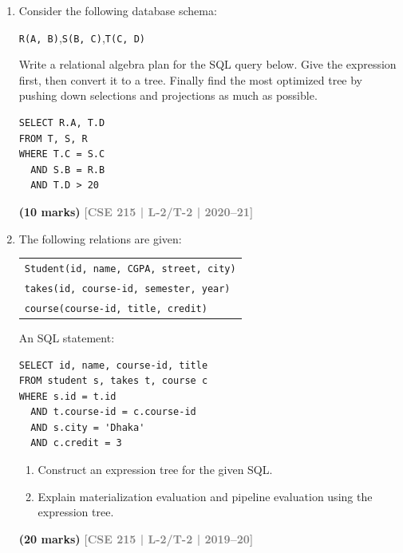 \documentclass[12pt]{article}
\newcommand{\yr}[1]{\hfill\textcolor{gray}{\small\textbf{[#1]}}}
\newcommand{\mk}[1]{\textcolor{orange!70!black}{\small\textbf{(#1 marks)}}}
\begin{document}
\begin{enumerate}
\vspace{0.2cm}
 
\vspace{0.2cm}

\textbf{Equivalence Rules (The notations carry usual meaning)}
\begin{enumerate}
    \item $\sigma_{\theta}(E_1 \times E_2) = E_1 \bowtie_{\theta} E_2$
    \item $\sigma_{\theta_0}(E_1 \bowtie_{\theta} E_2) \equiv (\sigma_{\theta_0}(E_1)) \bowtie_{\theta} E_2$
    \item $\sigma_{\theta_1 \wedge \theta_2}(E_1 \bowtie_{\theta} E_2) = (\sigma_{\theta_1}(E_1)) \bowtie_{\theta} (\sigma_{\theta_2}(E_2))$
    \item $\Pi_{L_1 \cup L_2}(E_1 \bowtie_{\theta} E_2) = \Pi_{L_1}(E_1) \bowtie_{\theta} \Pi_{L_2}(E_2)$
    \item $\Pi_{L_1 \cup L_2}(E_1 \bowtie_{\theta} E_2) = \Pi_{L_1 \cup L_2}(\Pi_{L_1 \cup L_3}(E_1) \bowtie_{\theta} \Pi_{L_2 \cup L_4}(E_2))$
\end{enumerate}
\vspace{0.1cm}

\mk{15} \yr{CSE 215 | L-2/T-2 | 2021--22}


\item Consider the following database schema:
\begin{center}
\texttt{R(A, B)},\quad \texttt{S(B, C)},\quad \texttt{T(C, D)}
\end{center}
Write a relational algebra plan for the SQL query below. Give the expression first, then convert it to a tree. Finally find the most optimized tree by pushing down selections and projections as much as possible.
\begin{lstlisting}
SELECT R.A, T.D
FROM T, S, R
WHERE T.C = S.C
  AND S.B = R.B
  AND T.D > 20
\end{lstlisting}
 \mk{10} \yr{CSE 215 | L-2/T-2 | 2020--21}


\item The following relations are given:
\begin{center}
\begin{tabular}{l}
\texttt{Student(id, name, CGPA, street, city)}\\
\texttt{takes(id, course-id, semester, year)}\\
\texttt{course(course-id, title, credit)}
\end{tabular}
\end{center}
An SQL statement:
\begin{lstlisting}
SELECT id, name, course-id, title
FROM student s, takes t, course c
WHERE s.id = t.id
  AND t.course-id = c.course-id
  AND s.city = 'Dhaka'
  AND c.credit = 3
\end{lstlisting}
\begin{enumerate}
  \item Construct an expression tree for the given SQL.
  \item Explain materialization evaluation and pipeline evaluation using the expression tree.
\end{enumerate}
\mk{20} \yr{CSE 215 | L-2/T-2 | 2019--20}



\end{enumerate}
\end{document}
